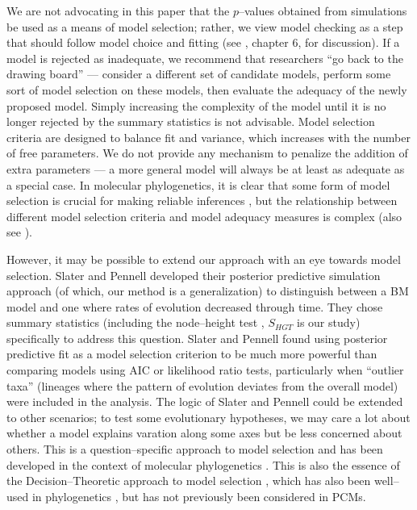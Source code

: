 \documentclass[a4paper,12pt]{article}
\begin{document}
We are not advocating in this paper that the $p$--values obtained from simulations be used as a means of model selection; rather, we view model checking as a step that should follow model choice and fitting (see \citep{Gelmanbook}, chapter 6, for discussion). If a model is rejected as inadequate, we recommend that researchers ``go back to the drawing board'' --- consider a different set of candidate models, perform some sort of model selection on these models, then evaluate the adequacy of the newly proposed model. Simply increasing the complexity of the model until it is no longer rejected by the summary statistics is not advisable.  Model selection criteria are designed to balance fit and variance, which increases with the number of free parameters. We do not provide any mechanism to penalize the addition of extra parameters --- a more general model will always be at least as adequate as a special case. In molecular phylogenetics, it is clear that some form of model selection is crucial for making reliable inferences \citep{SullivanJoyce2005, Ripplinger2008}, but the relationship between different model selection criteria and model adequacy measures is complex \citep{Ripplinger2010} (also see \citep{Boettiger2012}). 

However, it may be possible to extend our approach with an eye towards model selection. Slater and Pennell \citep{SlaterPennell} developed their posterior predictive simulation approach (of which, our method is a generalization) to distinguish between a BM model and one where rates of evolution decreased through time. They chose summary statistics (including the node--height test \citep{FreckletonHarvey2006}, $S_{HGT}$ is our study) specifically to address this question. Slater and Pennell found using posterior predictive fit as a model selection criterion to be much more powerful than comparing models using AIC or likelihood ratio tests, particularly when ``outlier taxa'' (lineages where the pattern of evolution deviates from the overall model) were included in the analysis. The logic of Slater and Pennell could be extended to other scenarios; to test some evolutionary hypotheses, we may care a lot about whether a model explains varation along some axes but be less concerned about others. This is a question--specific approach to model selection and has been developed in the context of molecular phylogenetics \citep{Bollback2002, Lewis2013}. This is also the essence of the Decision--Theoretic approach to model selection \citep{Robert2007}, which has also been well--used in phylogenetics \citep{Minin2003}, but has not previously been considered in PCMs.
\end{document}
